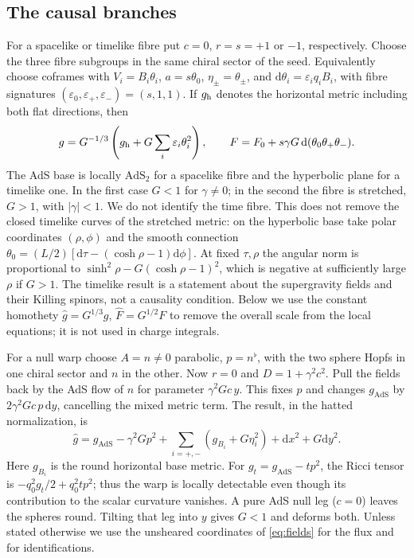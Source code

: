 \documentclass[11pt,a4paper]{article}
\numberwithin{equation}{section}
\newcommand{\AdS}{\mathrm{AdS}}
\newcommand{\dd}{\mathrm{d}}
\begin{document}
\subsection{The causal branches}

For a spacelike or timelike fibre put $c=0$, $r=s=+1$ or $-1$, respectively. Choose the three fibre subgroups in the same chiral sector of the seed. Equivalently choose coframes with $V_i=B_i\theta_i$, $a=s\theta_0$, $\eta_\pm=\theta_\pm$, and $\dd\theta_i=\varepsilon_i q_i B_i$, with fibre signatures $(\varepsilon_0,\varepsilon_+,\varepsilon_-)=(s,1,1)$. If $g_{\rm h}$ denotes the horizontal metric including both flat directions, then
\begin{equation}
 g=G^{-1/3}\left(g_{\rm h}+G\sum_i\varepsilon_i\theta_i^2\right),\qquad F=F_0+s\gamma G\,\dd(\theta_0\theta_+\theta_-).\label{eq:semisimple}
\end{equation}
The AdS base is locally $\AdS_2$ for a spacelike fibre and the hyperbolic plane for a timelike one. In the first case $G<1$ for $\gamma\ne0$; in the second the fibre is stretched, $G>1$, with $|\gamma|<1$. We do not identify the time fibre. This does not remove the closed timelike curves of the stretched metric: on the hyperbolic base take polar coordinates $(\rho,\phi)$ and the smooth connection $\theta_0=(L/2)[\dd\tau-(\cosh\rho-1)\dd\phi]$. At fixed $\tau,\rho$ the angular norm is proportional to $\sinh^2\rho-G(\cosh\rho-1)^2$, which is negative at sufficiently large $\rho$ if $G>1$. The timelike result is a statement about the supergravity fields and their Killing spinors, not a causality condition. Below we use the constant homothety $\widehat g=G^{1/3}g$, $\widehat F=G^{1/2}F$ to remove the overall scale from the local equations; it is not used in charge integrals.

For a null warp choose $A=n\ne0$ parabolic, $p=n^\flat$, with the two sphere Hopfs in one chiral sector and $n$ in the other. Now $r=0$ and $D=1+\gamma^2c^2$. Pull the fields back by the AdS flow of $n$ for parameter $\gamma^2Gc\,y$. This fixes $p$ and changes $g_{\AdS}$ by $2\gamma^2Gc\,p\,\dd y$, cancelling the mixed metric term. The result, in the hatted normalization, is
\begin{equation}
 \widehat g=g_{\AdS}-\gamma^2G p^2+\sum_{i=+,-}(g_{B_i}+G\eta_i^2)+\dd x^2+G\dd y^2 .\label{eq:nullmetric}
\end{equation}
Here $g_{B_i}$ is the round horizontal base metric. For $g_t=g_{\AdS}-t p^2$, the Ricci tensor is $-q_0^2 g_t/2+q_0^2t p^2$; thus the warp is locally detectable even though its contribution to the scalar curvature vanishes. A pure AdS null leg ($c=0$) leaves the spheres round. Tilting that leg into $y$ gives $G<1$ and deforms both. Unless stated otherwise we use the unsheared coordinates of \eqref{eq:fields} for the flux and for identifications.
\end{document}
